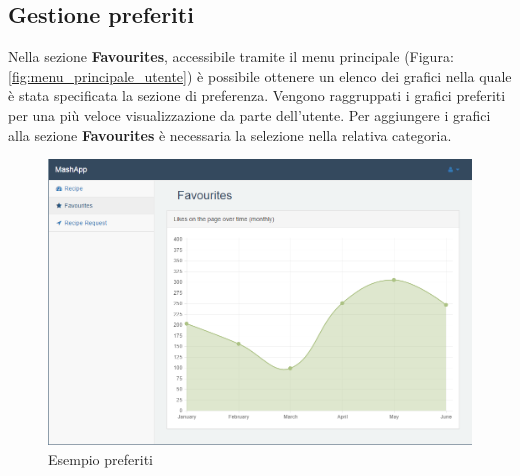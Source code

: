 	\subsection{Gestione preferiti} %
	\label{sec:gestione_preferiti}
		Nella sezione \textbf{Favourites}, accessibile tramite il menu principale (Figura: \ref{fig:menu_principale_utente}) è possibile ottenere un elenco dei grafici nella quale è stata specificata la sezione di preferenza. Vengono raggruppati i grafici preferiti per una più veloce visualizzazione da parte dell'utente.\newline
		Per aggiungere i grafici alla sezione \textbf{Favourites} è necessaria la selezione nella relativa categoria.\newline
		\begin{figure}[H]
			\centering
			\centerline{\includegraphics[width=14cm]{images/esempio_preferiti.png}}
			\caption{Esempio preferiti}
			\label{fig:esempio_preferiti}
		\end{figure}


	\pagebreak
